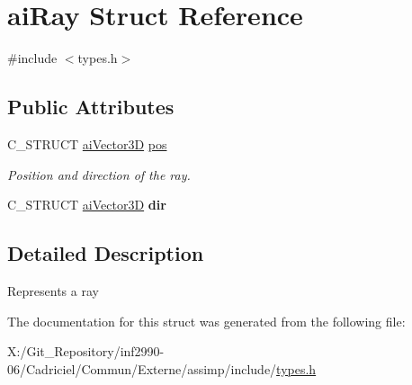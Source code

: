 \hypertarget{structai_ray}{\section{ai\-Ray Struct Reference}
\label{structai_ray}
}


{\ttfamily \#include $<$types.\-h$>$}

\subsection*{Public Attributes}
\begin{DoxyCompactItemize}
\item 
\hypertarget{structai_ray_a312f663a7d2580b1b3beb52ffd4ab4c9}{C\-\_\-\-S\-T\-R\-U\-C\-T \hyperlink{structai_vector3_d}{ai\-Vector3\-D} \hyperlink{structai_ray_a312f663a7d2580b1b3beb52ffd4ab4c9}{pos}}\label{structai_ray_a312f663a7d2580b1b3beb52ffd4ab4c9}

\begin{DoxyCompactList}\small\item\em Position and direction of the ray. \end{DoxyCompactList}\item 
\hypertarget{structai_ray_a635d9120af2654716e5e7952d837282b}{C\-\_\-\-S\-T\-R\-U\-C\-T \hyperlink{structai_vector3_d}{ai\-Vector3\-D} {\bfseries dir}}\label{structai_ray_a635d9120af2654716e5e7952d837282b}

\end{DoxyCompactItemize}


\subsection{Detailed Description}
Represents a ray 

The documentation for this struct was generated from the following file\-:\begin{DoxyCompactItemize}
\item 
X\-:/\-Git\-\_\-\-Repository/inf2990-\/06/\-Cadriciel/\-Commun/\-Externe/assimp/include/\hyperlink{types_8h}{types.\-h}\end{DoxyCompactItemize}
